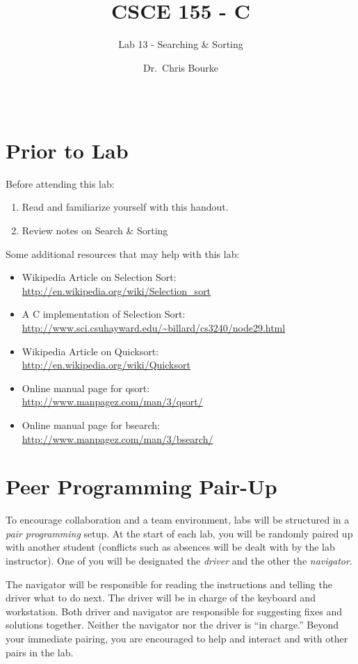 \documentclass[12pt]{scrartcl}
\title{CSCE 155 - C}
\subtitle{Lab 13 - Searching \& Sorting}
\author{Dr.\ Chris Bourke}
\date{~}
\begin{document}
\maketitle

\section*{Prior to Lab}

Before attending this lab:
\begin{enumerate}
  \item Read and familiarize yourself with this handout.
  \item Review notes on Search \& Sorting
\end{enumerate}

Some additional resources that may help with this lab:
\begin{itemize}
  \item Wikipedia Article on Selection Sort: \\
  	\url{http://en.wikipedia.org/wiki/Selection_sort}
  \item A C implementation of Selection Sort: \\
  	\url{http://www.sci.csuhayward.edu/~billard/cs3240/node29.html}
  \item Wikipedia Article on Quicksort: \\
  	\url{http://en.wikipedia.org/wiki/Quicksort}
  \item Online manual page for qsort: \\
  	\url{http://www.manpagez.com/man/3/qsort/}
  \item Online manual page for bsearch: \\
  	\url{http://www.manpagez.com/man/3/bsearch/}
\end{itemize}

\section*{Peer Programming Pair-Up}

To encourage collaboration and a team environment, labs will be
structured in a \emph{pair programming} setup.  At the start of
each lab, you will be randomly paired up with another student 
(conflicts such as absences will be dealt with by the lab instructor).
One of you will be designated the \emph{driver} and the other
the \emph{navigator}.  

The navigator will be responsible for reading the instructions and
telling the driver what to do next.  The driver will be in charge of the
keyboard and workstation.  Both driver and navigator are responsible
for suggesting fixes and solutions together.  Neither the navigator
nor the driver is ``in charge.''  Beyond your immediate pairing, you
are encouraged to help and interact and with other pairs in the lab.
\end{document}
